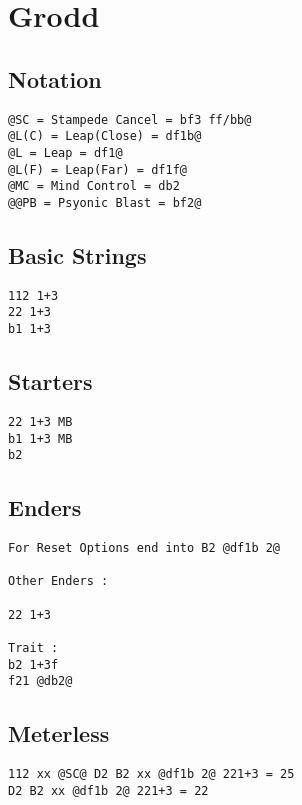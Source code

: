 \documentclass[main.tex]{subfiles}
\begin{document}
\chapter{Grodd}

\section{Notation}
\begin{lstlisting}[language=FG]
@SC = Stampede Cancel = bf3 ff/bb@
@L(C) = Leap(Close) = df1b@
@L = Leap = df1@
@L(F) = Leap(Far) = df1f@
@MC = Mind Control = db2
@@PB = Psyonic Blast = bf2@
\end{lstlisting}


\section{Basic Strings}

\begin{lstlisting}[language=FG]
112 1+3
22 1+3
b1 1+3
\end{lstlisting}

\section{Starters}
\begin{lstlisting}[language=FG]
22 1+3 MB
b1 1+3 MB
b2

\end{lstlisting}

\section{Enders}

\begin{lstlisting}[language=FG]
For Reset Options end into B2 @df1b 2@ 

Other Enders :

22 1+3

Trait :
b2 1+3f
f21 @db2@
\end{lstlisting}

\section{Meterless}


\begin{lstlisting}[language=FG]
112 xx @SC@ D2 B2 xx @df1b 2@ 221+3 = 25
D2 B2 xx @df1b 2@ 221+3 = 22
\end{lstlisting}
\end{document}
